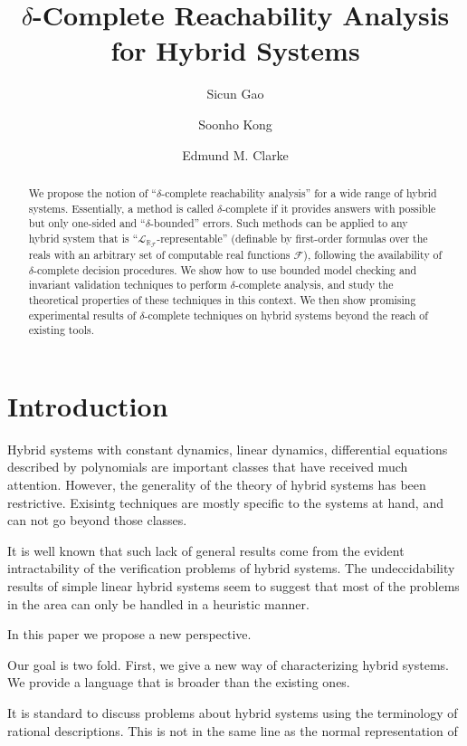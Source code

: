 \documentclass[envcountsect]{llncs}
\title{$\delta$-Complete Reachability Analysis for Hybrid Systems}
\author{Sicun Gao \and Soonho Kong \and Edmund M. Clarke}
\institute{Carnegie Mellon University, Pittsburgh, PA 15213}
\newcommand{\lrf}{\mathcal{L}_{\mathbb{R}_{\mathcal{F}}}}
\begin{document}
\maketitle

\begin{abstract}
We propose the notion of ``$\delta$-complete reachability analysis'' for a wide range of hybrid systems. Essentially, a method is called $\delta$-complete if it provides answers with possible but only one-sided  and ``$\delta$-bounded'' errors. Such methods can be applied to any hybrid system that is ``$\lrf$-representable'' (definable by first-order formulas over the reals with an arbitrary set of computable real functions $\mathcal{F}$), following the availability of $\delta$-complete decision procedures. We show how to use bounded model checking and invariant validation techniques to perform $\delta$-complete analysis, and study the theoretical properties of these techniques in this context. We then show promising experimental results of $\delta$-complete techniques on hybrid systems beyond the reach of existing tools. 
\end{abstract}

\section{Introduction}

Hybrid systems with constant dynamics, linear dynamics, differential equations described by polynomials are important classes that have received much attention. However, the generality of the theory of hybrid systems has been restrictive. Exisintg techniques are mostly specific to the systems at hand, and can not go beyond those classes. 

It is well known that such lack of general results come from the evident intractability of the verification problems of hybrid systems. The undeccidability results of simple linear hybrid systems seem to suggest that most of the problems in the area can only be handled in a heuristic manner. 

In this paper we propose a new perspective. 

Our goal is two fold. First, we give a new way of characterizing hybrid systems. We provide a language that is broader than the existing ones. 

It is standard to discuss problems about hybrid systems using the terminology of rational descriptions. This is not in the same line as the normal representation of 
\end{document}

